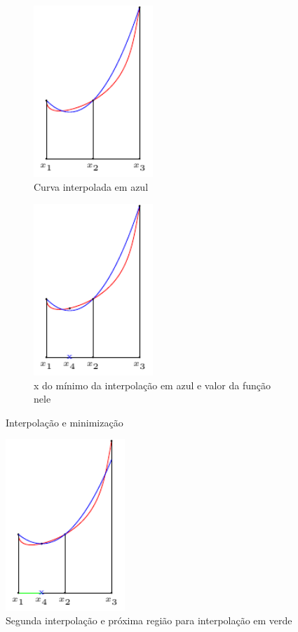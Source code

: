 \begin{figure}[H]
	\begin{center}	
		\begin{subfigure}{.5\textwidth}
  			\centering
  			\includegraphics[width=4.5cm]{../interpol/interpol_3}
  			\caption{Curva interpolada em azul}
  		\label{fig:interpol_3}
		\end{subfigure}%
		\begin{subfigure}{.5\textwidth}
  			\centering
  			\includegraphics[width=4.5cm]{../interpol/interpol_4}
  			\caption{x do mínimo da interpolação em azul e valor da função nele}
  			\label{fig:interpol_4}
		\end{subfigure}	
	\end{center}
	\caption{Interpolação e minimização}
\end{figure}

\begin{figure}[H]
	\begin{center}		
  			\includegraphics[width=4.5cm]{../interpol/interpol_5}
  			\caption{Segunda interpolação e próxima região para interpolação em verde}
  			\label{fig:interpol_5}
	\end{center}
\end{figure}


